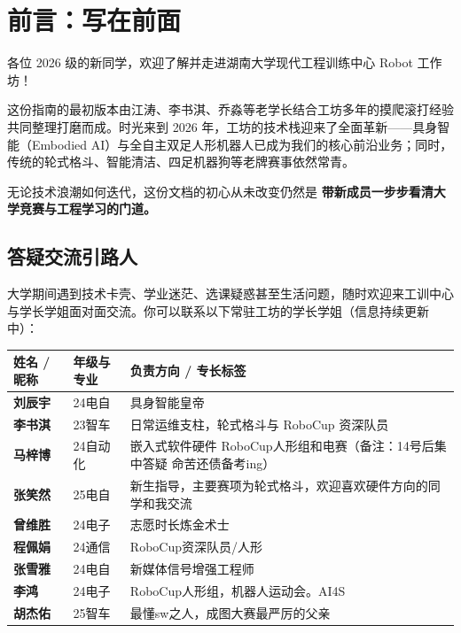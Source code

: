 \documentclass[a4paper,11pt,oneside]{scrreprt}
\begin{document}

\chapter*{前言：写在前面}
{}

各位 2026 级的新同学，欢迎了解并走进湖南大学现代工程训练中心 Robot 工作坊！

这份指南的最初版本由江涛、李书淇、乔淼等老学长结合工坊多年的摸爬滚打经验共同整理打磨而成。时光来到 2026 年，工坊的技术栈迎来了全面革新——具身智能（Embodied AI）与全自主双足人形机器人已成为我们的核心前沿业务；同时，传统的轮式格斗、智能清洁、四足机器狗等老牌赛事依然常青。

无论技术浪潮如何迭代，这份文档的初心从未改变仍然是 \textbf{带新成员一步步看清大学竞赛与工程学习的门道。}

\section*{答疑交流引路人}
{}

大学期间遇到技术卡壳、学业迷茫、选课疑惑甚至生活问题，随时欢迎来工训中心与学长学姐面对面交流。你可以联系以下常驻工坊的学长学姐（信息持续更新中）：

\begin{center}
\small
\renewcommand{\arraystretch}{1.3}
\begin{tabularx}{\textwidth}{@{} l p{2.6cm} X @{}}
\toprule
\textbf{姓名 / 昵称} & \textbf{年级与专业} & \textbf{负责方向 / 专长标签} \\
\midrule
\textbf{刘辰宇} & 24电自 & 具身智能皇帝 \\
\textbf{李书淇} & 23智车 & 日常运维支柱，轮式格斗与 RoboCup 资深队员 \\
\textbf{马梓博} & 24自动化 & 嵌入式软件硬件 RoboCup人形组和电赛（备注：14号后集中答疑 命苦还债备考ing） \\
\textbf{张笑然} & 25电自 & 新生指导，主要赛项为轮式格斗，欢迎喜欢硬件方向的同学和我交流 \\
\textbf{曾维胜} & 24电子 & 志愿时长炼金术士 \\
\textbf{程佩娟} & 24通信 & RoboCup资深队员/人形 \\
\textbf{张雪雅} & 24电自 & 新媒体信号增强工程师 \\
\textbf{李鸿}   & 24电子 & RoboCup人形组，机器人运动会。AI4S \\
\textbf{胡杰佑} & 25智车 & 最懂sw之人，成图大赛最严厉的父亲 \\
\bottomrule
\end{tabularx}
\end{center}
\end{document}
